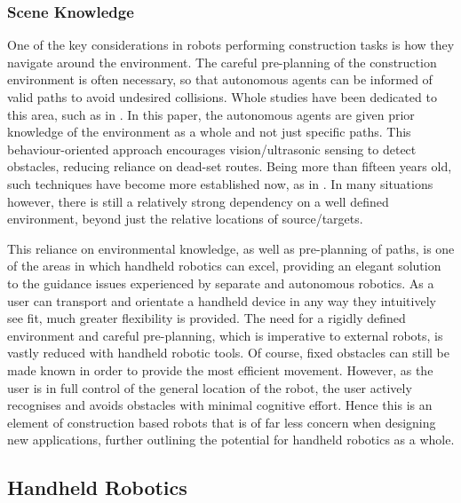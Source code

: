 \documentclass[11pt]{article}
\begin{document}
\subsubsection{Scene Knowledge}
One of the key considerations in robots performing construction tasks is how they navigate around the environment. The careful pre-planning of the construction environment is often necessary, so that autonomous agents can be informed of valid paths to avoid undesired collisions. Whole studies have been dedicated to this area, such as in \cite{Arkin1990}. In this paper, the autonomous agents are given prior knowledge of the environment as a whole and not just specific paths. This behaviour-oriented approach encourages vision/ultrasonic sensing to detect obstacles, reducing reliance on dead-set routes. Being more than fifteen years old, such techniques have become more established now, as in \cite{Petersen2011}. In many situations however, there is still a relatively strong dependency on a well defined environment, beyond just the relative locations of source/targets.

This reliance on environmental knowledge, as well as pre-planning of paths, is one of the areas in which handheld robotics can excel, providing an elegant solution to the guidance issues experienced by separate and autonomous robotics. As a user can transport and orientate a handheld device in any way they intuitively see fit, much greater flexibility is provided. The need for a rigidly defined environment and careful pre-planning, which is imperative to external robots, is vastly reduced with handheld robotic tools. Of course, fixed obstacles can still be made known in order to provide the most efficient movement. However, as the user is in full control of the general location of the robot, the user actively recognises and avoids obstacles with minimal cognitive effort. Hence this is an element of construction based robots that is of far less concern when designing new applications, further outlining the potential for handheld robotics as a whole. 

\pagebreak












\subsection{Handheld Robotics} \label{handheld}
\end{document}
